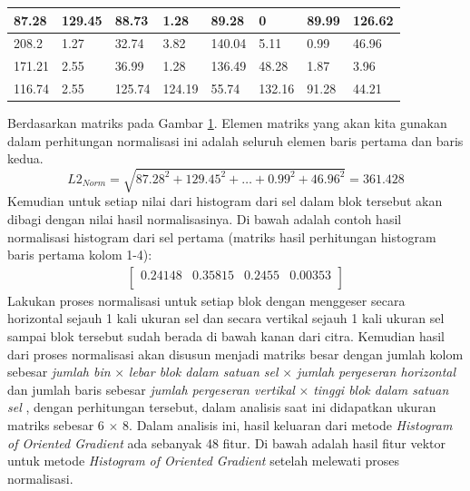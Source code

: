 \begin{enumerate}
\begin{table}[H]
\begin{small}
\begin{tabular}{|p{1cm}|p{1cm}|p{1cm}|p{1cm}|p{1cm}|p{1cm}|p{1cm}|p{1cm}|}
			\hline
			87.28 & 129.45 & 88.73 & 1.28 & 89.28 & 0 & 89.99 & 126.62 \\
			\hline
			208.2 & 1.27 & 32.74 & 3.82 & 140.04 & 5.11 & 0.99 & 46.96 \\
			\hline
			171.21 & 2.55 & 36.99 & 1.28 & 136.49 & 48.28 & 1.87 & 3.96 \\
			\hline
			116.74 & 2.55 & 125.74 & 124.19 & 55.74 & 132.16 & 91.28 & 44.21 \\
			\hline
		\end{tabular}
	\end{small}
	\label{fig:MatriksHasilPerhitunganHistogram}
\end{table}
Berdasarkan matriks pada Gambar \ref{fig:MatriksHasilPerhitunganHistogram}. Elemen matriks yang akan kita gunakan dalam perhitungan normalisasi ini adalah seluruh elemen baris pertama dan baris kedua.
\begin{equation*}
L2_{Norm} = \sqrt{87.28^2 + 129.45^2 + \ldots + 0.99^2 + 46.96^2} = 361.428
\end{equation*}
Kemudian untuk setiap nilai dari histogram dari sel dalam blok tersebut akan dibagi dengan nilai hasil normalisasinya. Di bawah adalah contoh hasil normalisasi histogram dari sel pertama (matriks hasil perhitungan histogram baris pertama kolom 1-4):
\begin{gather*}
\begin{bmatrix}
0.24148 & 0.35815 & 0.2455 & 0.00353 \\
\end{bmatrix}
\end{gather*}
Lakukan proses normalisasi untuk setiap blok dengan menggeser secara horizontal sejauh 1 kali ukuran sel dan secara vertikal sejauh 1 kali ukuran sel sampai blok tersebut sudah berada di bawah kanan dari citra. Kemudian hasil dari proses normalisasi akan disusun menjadi matriks besar dengan jumlah kolom sebesar  \textit{jumlah bin} $\times$ \textit{lebar blok dalam satuan sel} $\times$ \textit{jumlah pergeseran horizontal} dan jumlah baris sebesar \textit{jumlah pergeseran vertikal} $\times$ \textit{tinggi blok dalam satuan sel} , dengan perhitungan tersebut, dalam analisis saat ini didapatkan ukuran matriks sebesar 6 $\times$ 8. Dalam analisis ini, hasil keluaran dari metode \textit{Histogram of Oriented Gradient} ada sebanyak 48 fitur. Di bawah adalah hasil fitur vektor untuk metode \textit{Histogram of Oriented Gradient} setelah melewati proses normalisasi.\\

\end{enumerate}
